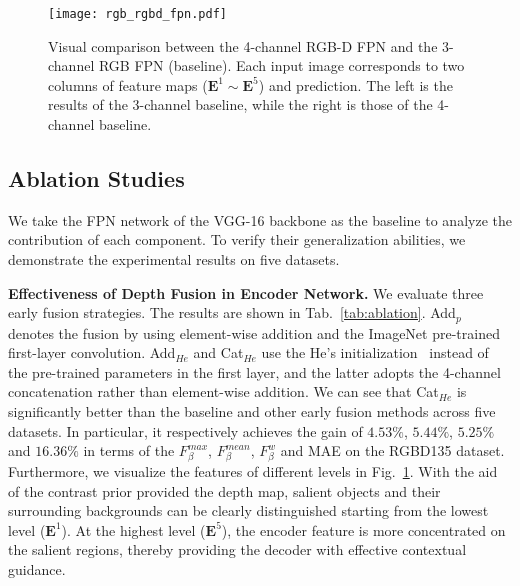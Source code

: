 \documentclass[runningheads]{llncs}
\begin{document}
 \begin{figure}
  \centering
  \texttt{[image: rgb\_rgbd\_fpn.pdf]}
  \caption{Visual comparison between the 4-channel RGB-D FPN and the 3-channel RGB FPN (baseline). Each input image corresponds to two columns of feature maps ($\mathbf{E}^1 \sim \mathbf{E}^5$) and prediction. The left is the results of the 3-channel baseline, while the right is those of the 4-channel baseline. 
  }\label{fig:rgb_rgbd_fpn}
  \end{figure}


  
\subsection{Ablation Studies}
We take the FPN network of the VGG-16 backbone as the baseline to analyze the contribution of each component. To verify their generalization abilities, we demonstrate the experimental results on five datasets.

\textbf{Effectiveness of Depth Fusion in Encoder Network.} We evaluate three early fusion strategies. The results are shown in Tab.~\ref{tab:ablation}. Add$_p$ denotes the fusion by using element-wise addition and the ImageNet pre-trained first-layer convolution. Add$_{He}$ and Cat$_{He}$ use the He's initialization~\cite{PRelu} instead of the pre-trained parameters in the first layer, and the latter adopts the 4-channel concatenation rather than element-wise addition. 
We can see that Cat$_{He}$ is significantly better than the baseline and other early fusion methods across five datasets. In particular, it respectively achieves the gain of $4.53\%$, $5.44\%$, $5.25\%$ and $16.36\%$ in terms of the $F_{\beta}^{max}$, $F_{\beta}^{mean}$, $F_{\beta}^{w}$ and MAE on the RGBD135 dataset.
Furthermore, we visualize the features of different levels in Fig.~\ref{fig:rgb_rgbd_fpn}. With the aid of the contrast prior provided the depth map, salient objects and their surrounding backgrounds can be clearly distinguished starting from the lowest level ($\mathbf{E}^1$). At the highest level ($\mathbf{E}^5$), the encoder feature is more concentrated on the salient regions, thereby providing the decoder with effective contextual guidance. 
\end{document}
